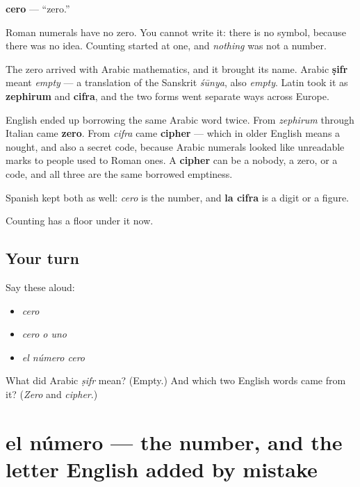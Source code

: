 \begin{cousinweb}
\textbf{cero} — \textquotedblleft{}zero.\textquotedblright{}

Roman numerals have no zero. You cannot write it: there is no symbol, because there was no idea. Counting started at one, and \emph{nothing} was not a number.

The zero arrived with Arabic mathematics, and it brought its name. Arabic \textbf{ṣifr} meant \emph{empty} — a translation of the Sanskrit \emph{śūnya}, also \emph{empty}. Latin took it as \textbf{zephirum} and \textbf{cifra}, and the two forms went separate ways across Europe.

English ended up borrowing the same Arabic word twice. From \emph{zephirum} through Italian came \textbf{zero}. From \emph{cifra} came \textbf{cipher} — which in older English means a nought, and also a secret code, because Arabic numerals looked like unreadable marks to people used to Roman ones. A \textbf{cipher} can be a nobody, a zero, or a code, and all three are the same borrowed emptiness.

Spanish kept both as well: \emph{cero} is the number, and \textbf{la cifra} is a digit or a figure.
\end{cousinweb}

\begin{grammarlens}[title={What you've built}]
Counting has a floor under it now.
\end{grammarlens}

\subsection*{Your turn}
Say these aloud:

\begin{itemize}
\raggedright
  \item \emph{cero}
  \item \emph{cero o uno}
  \item \emph{el número cero}
\end{itemize}

\begin{tcolorbox}[breakable,colback=teal!4,colframe=teal!35!black,title={Before you move on}]
What did Arabic \emph{ṣifr} mean? (Empty.) And which two English words came from it? (\emph{Zero} and \emph{cipher}.)
\end{tcolorbox}
\section[el número]{el número — the number, and the letter English added by mistake}


